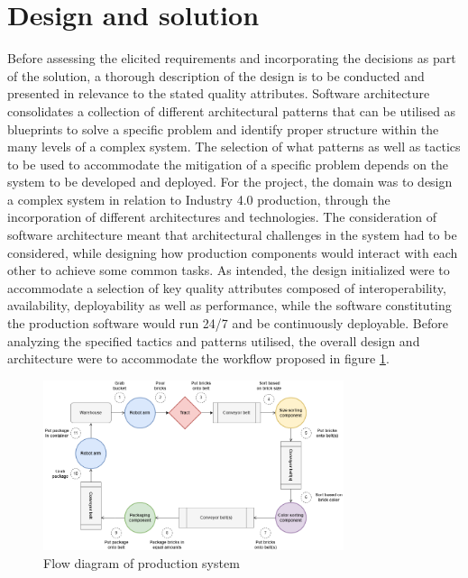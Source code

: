 \section{Design and solution}
\label{sec:middleware_architecture}
Before assessing the elicited requirements and incorporating the decisions as part of the solution, a thorough description of the design is to be conducted and presented in relevance to the stated quality attributes. Software architecture consolidates a collection of different architectural patterns that can be utilised as blueprints to solve a specific problem and identify proper structure within the many levels of a complex system. The selection of what patterns as well as tactics to be used to accommodate the mitigation of a specific problem depends on the system to be developed and deployed. For the project, the domain was to design a complex system in relation to Industry 4.0 production, through the incorporation of different architectures and technologies. The consideration of software architecture meant that architectural challenges in the system had to be considered, while designing how production components would interact with each other to achieve some common tasks. As intended, the design initialized were to accommodate a selection of key quality attributes composed of interoperability, availability, deployability as well as performance, while the software constituting the production software would run 24/7 and be continuously deployable. Before analyzing the specified tactics and patterns utilised, the overall design and architecture were to accommodate the workflow proposed in figure \ref{fig:flow-diagram}.

\begin{figure}[!htb]
    \includegraphics[width=250pt]{images/flow-diagram.png}
    \caption{Flow diagram of production system}
    \label{fig:flow-diagram}
\end{figure}

